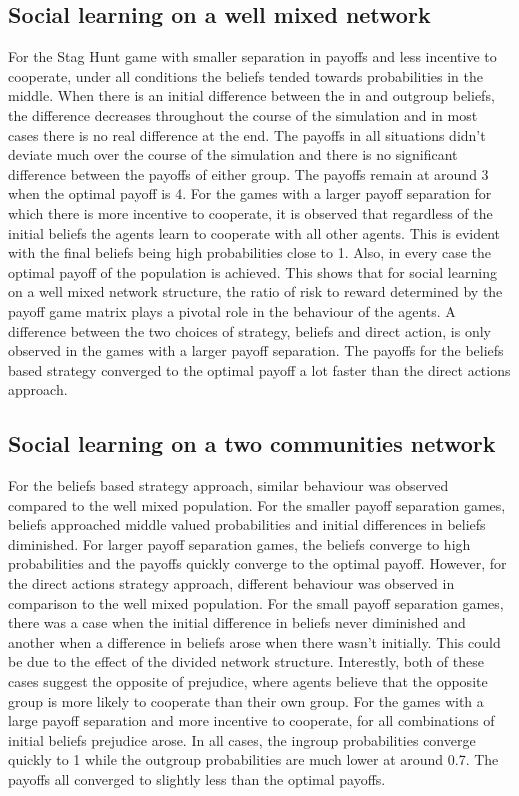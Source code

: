\documentclass[]{llncs}
\begin{document}
\subsection{Social learning on a well mixed network}
For the Stag Hunt game with smaller separation in payoffs and less incentive to cooperate, under all conditions the beliefs tended towards probabilities in the middle. When there is an initial difference between the in and outgroup beliefs, the difference decreases throughout the course of the simulation and in most cases there is no real difference at the end. The payoffs in all situations didn’t deviate much over the course of the simulation and there is no significant difference between the payoffs of either group. The payoffs remain at around 3 when the optimal payoff is 4.
For the games with a larger payoff separation for which there is more incentive to cooperate, it is observed that regardless of the initial beliefs the agents learn to cooperate with all other agents. This is evident with the final beliefs being high probabilities close to 1. Also, in every case the optimal payoff of the population is achieved. This shows that for social learning on a well mixed network structure, the ratio of risk to reward determined by the payoff game matrix plays a pivotal role in the behaviour of the agents. A difference between the two choices of strategy, beliefs and direct action, is only observed in the games with a larger payoff separation. The payoffs for the beliefs based strategy converged to the optimal payoff a lot faster than the direct actions approach. 


\subsection{Social learning on a two communities network}
For the beliefs based strategy approach, similar behaviour was observed compared to the well mixed population. For the smaller payoff separation games, beliefs approached middle valued probabilities and initial differences in beliefs diminished. For larger payoff separation games, the beliefs converge to high probabilities and the payoffs quickly converge to the optimal payoff.
However, for the direct actions strategy approach, different behaviour was observed in comparison to the well mixed population. For the small payoff separation games, there was a case when the initial difference in beliefs never diminished and another when a difference in beliefs arose when there wasn’t initially. This could be due to the effect of the divided network structure. Interestly, both of these cases suggest the opposite of prejudice, where agents believe that the opposite group is more likely to cooperate than their own group.
For the games with a large payoff separation and more incentive to cooperate, for all combinations of initial beliefs prejudice arose. In all cases, the ingroup probabilities converge quickly to 1 while the outgroup probabilities are much lower at around 0.7. The payoffs all converged to slightly less than the optimal payoffs.
\end{document}

